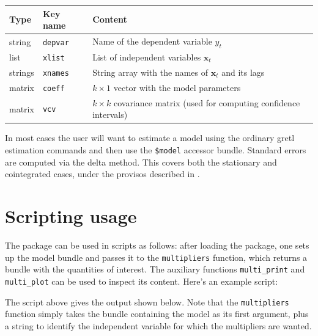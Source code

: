 \documentclass[a4paper,10pt]{article}
\newcommand{\xb}{\mathbf{x}}
\begin{document}
\medskip
\begin{center}
\begin{tabular}{llp{}}
  \hline
  \textbf{Type} & \textbf{Key name} & \textbf{Content} \\
  \hline
  string & \texttt{depvar} & Name of the dependent variable $y_t$ \\ 
  list & \texttt{xlist} & List of independent variables
                          $\xb_t$ \\ 
  strings & \texttt{xnames} & String array with the names of $\xb_t$
                              and its lags \\ 
  matrix & \texttt{coeff} & $k \times 1$ vector with the model parameters   \\ 
  matrix & \texttt{vcv} & $k \times k$ covariance matrix (used for
                          computing confidence intervals) \\
  \hline
\end{tabular}
\end{center}

\medskip

In most cases the user will want to estimate a model using the ordinary
gretl estimation commands and then use the \verb|$model| accessor bundle.
Standard errors are computed via the delta method. This covers both
the stationary and cointegrated cases, under the provisos described in
\cite{PesaranShin1998}.

\section{Scripting usage}
\label{sec:scripting}

The package can be used in scripts as follows: after loading the
package, one sets up the model bundle and passes it to the
\texttt{multipliers} function, which returns a bundle with the
quantities of interest. The auxiliary functions \texttt{multi\_print}
and \texttt{multi\_plot} can be used to inspect its content. Here's an
example script:

The script above gives the output shown below. Note that the
\texttt{multipliers} function simply takes the bundle containing the
model as its first argument, plus a string to identify the independent
variable for which the multipliers are wanted.
\end{document}
